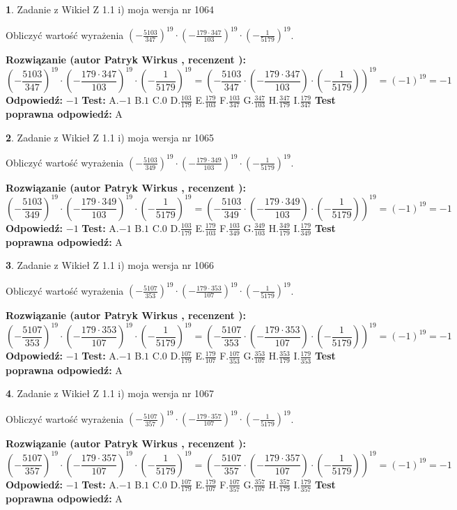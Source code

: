 \documentclass[12pt, a4paper]{article}
\theoremstyle{definition} %
\newtheorem{zad}{}
\newcommand{\zadStart}[1]{\begin{zad}#1\newline}
\newcommand{\zadStop}{\end{zad}}
\newcommand{\rozwStart}[2]{\noindent \textbf{Rozwiązanie (autor #1 , recenzent #2): }\newline}
\newcommand{\rozwStop}{\newline}
\newcommand{\odpStart}{\noindent \textbf{Odpowiedź:}\newline}
\newcommand{\odpStop}{\newline}
\newcommand{\testStart}{\noindent \textbf{Test:}\newline}
\newcommand{\testStop}{\newline}
\newcommand{\kluczStart}{\noindent \textbf{Test poprawna odpowiedź:}\newline}
\newcommand{\kluczStop}{\newline}
\begin{document}
\zadStart{Zadanie z Wikieł Z 1.1 i) moja wersja nr 1064}

Obliczyć wartość wyrażenia $(-\frac{5103}{347})^{19} \cdot (-\frac{179 \cdot 347}{103})^{19} \cdot (-\frac{1}{5179})^{19}$.
\zadStop
\rozwStart{Patryk Wirkus}{}
$$(-\frac{5103}{347})^{19} \cdot (-\frac{179 \cdot 347}{103})^{19} \cdot (-\frac{1}{5179})^{19} = (-\frac{5103}{347} \cdot (-\frac{179 \cdot 347}{103}) \cdot (-\frac{1}{5179}))^{19} = (-1)^{19} = -1$$
\rozwStop
\odpStart
$-1$
\odpStop
\testStart
A.$-1$ B.$1$ C.$0$ D.$\frac{103}{179}$ E.$\frac{179}{103}$
F.$\frac{103}{347}$ G.$\frac{347}{103}$
H.$\frac{347}{179}$
I.$\frac{179}{347}$
\testStop
\kluczStart
A
\kluczStop



\zadStart{Zadanie z Wikieł Z 1.1 i) moja wersja nr 1065}

Obliczyć wartość wyrażenia $(-\frac{5103}{349})^{19} \cdot (-\frac{179 \cdot 349}{103})^{19} \cdot (-\frac{1}{5179})^{19}$.
\zadStop
\rozwStart{Patryk Wirkus}{}
$$(-\frac{5103}{349})^{19} \cdot (-\frac{179 \cdot 349}{103})^{19} \cdot (-\frac{1}{5179})^{19} = (-\frac{5103}{349} \cdot (-\frac{179 \cdot 349}{103}) \cdot (-\frac{1}{5179}))^{19} = (-1)^{19} = -1$$
\rozwStop
\odpStart
$-1$
\odpStop
\testStart
A.$-1$ B.$1$ C.$0$ D.$\frac{103}{179}$ E.$\frac{179}{103}$
F.$\frac{103}{349}$ G.$\frac{349}{103}$
H.$\frac{349}{179}$
I.$\frac{179}{349}$
\testStop
\kluczStart
A
\kluczStop



\zadStart{Zadanie z Wikieł Z 1.1 i) moja wersja nr 1066}

Obliczyć wartość wyrażenia $(-\frac{5107}{353})^{19} \cdot (-\frac{179 \cdot 353}{107})^{19} \cdot (-\frac{1}{5179})^{19}$.
\zadStop
\rozwStart{Patryk Wirkus}{}
$$(-\frac{5107}{353})^{19} \cdot (-\frac{179 \cdot 353}{107})^{19} \cdot (-\frac{1}{5179})^{19} = (-\frac{5107}{353} \cdot (-\frac{179 \cdot 353}{107}) \cdot (-\frac{1}{5179}))^{19} = (-1)^{19} = -1$$
\rozwStop
\odpStart
$-1$
\odpStop
\testStart
A.$-1$ B.$1$ C.$0$ D.$\frac{107}{179}$ E.$\frac{179}{107}$
F.$\frac{107}{353}$ G.$\frac{353}{107}$
H.$\frac{353}{179}$
I.$\frac{179}{353}$
\testStop
\kluczStart
A
\kluczStop



\zadStart{Zadanie z Wikieł Z 1.1 i) moja wersja nr 1067}

Obliczyć wartość wyrażenia $(-\frac{5107}{357})^{19} \cdot (-\frac{179 \cdot 357}{107})^{19} \cdot (-\frac{1}{5179})^{19}$.
\zadStop
\rozwStart{Patryk Wirkus}{}
$$(-\frac{5107}{357})^{19} \cdot (-\frac{179 \cdot 357}{107})^{19} \cdot (-\frac{1}{5179})^{19} = (-\frac{5107}{357} \cdot (-\frac{179 \cdot 357}{107}) \cdot (-\frac{1}{5179}))^{19} = (-1)^{19} = -1$$
\rozwStop
\odpStart
$-1$
\odpStop
\testStart
A.$-1$ B.$1$ C.$0$ D.$\frac{107}{179}$ E.$\frac{179}{107}$
F.$\frac{107}{357}$ G.$\frac{357}{107}$
H.$\frac{357}{179}$
I.$\frac{179}{357}$
\testStop
\kluczStart
A
\kluczStop
\end{document}
